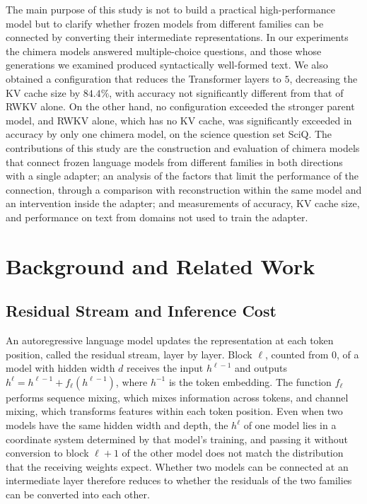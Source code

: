 \documentclass[conference]{IEEEtran}
\begin{document}
The main purpose of this study is not to build a practical high-performance model but to clarify whether frozen models from
different families can be connected by converting their intermediate representations. In our experiments the chimera models
answered multiple-choice questions, and those whose generations we examined produced syntactically well-formed text. We also obtained a configuration that reduces the
Transformer layers to $5$, decreasing the KV cache size by $84.4\%$, with accuracy not significantly different from that of RWKV alone.
On the other hand, no configuration exceeded the stronger parent model, and RWKV alone, which has no KV cache, was significantly
exceeded in accuracy by only one chimera model, on the science question set SciQ. The contributions of this study are the construction and evaluation of chimera models that connect frozen
language models from different families in both directions with a single adapter; an analysis of the factors that limit the
performance of the connection, through a comparison with reconstruction within the same model and an intervention inside the
adapter; and measurements of accuracy, KV cache size, and performance on text from domains not used to train the adapter.

\section{Background and Related Work}\label{sec:related}
\subsection{Residual Stream and Inference Cost}
An autoregressive language model updates the representation at each token position, called the residual stream, layer by layer.
Block $\ell$, counted from $0$, of a model with hidden width $d$ receives the input $h^{\ell-1}$ and outputs $h^{\ell}=h^{\ell-1}+f_\ell(h^{\ell-1})$,
where $h^{-1}$ is the token embedding.
The function $f_\ell$ performs sequence mixing, which mixes information across tokens, and channel mixing, which transforms features
within each token position. Even when two models have the same hidden width and depth, the $h^{\ell}$ of one model lies in a coordinate
system determined by that model's training, and passing it without conversion to block $\ell{+}1$ of the other model does not match
the distribution that the receiving weights expect. Whether two models can be connected at an intermediate layer therefore reduces
to whether the residuals of the two families can be converted into each other.
\end{document}
